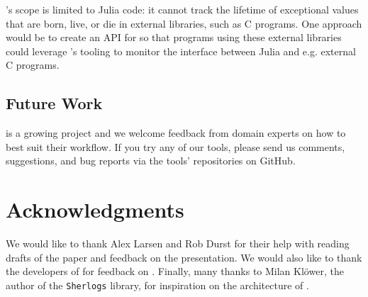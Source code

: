 \documentclass{juliacon}
\begin{document}
\FT{}'s scope is limited to Julia code: it cannot track the lifetime of exceptional values that are born, live, or die in external libraries, such as C programs.
One approach would be to create an API for \FT{} so that programs using these external libraries could leverage \FT{}'s tooling to monitor the interface between Julia and e.g. external C programs.

\subsection{Future Work}

\FlowFPX{} is a growing project and we welcome feedback from domain experts
on how to best suit their workflow.
If you try any of our tools, please send us comments, suggestions, and bug reports via the tools' repositories on GitHub.

\section{Acknowledgments}

We would like to thank Alex Larsen and Rob Durst for their help with reading drafts of the paper and feedback on the presentation.
We would also like to thank the developers of  for feedback on \FlowFPX{}.
Finally, many thanks to Milan Klöwer, the author of the \texttt{Sherlogs} library, for inspiration on the architecture of \FT{}.


\end{document}

